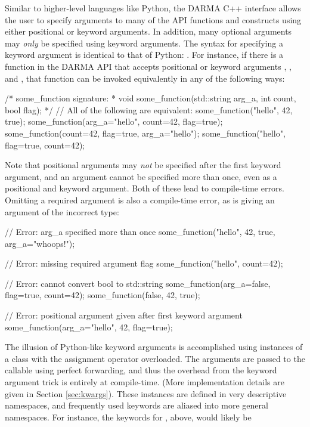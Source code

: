 Similar to higher-level languages like Python, the DARMA C++ interface allows the user
to specify arguments to many of the API functions and constructs using either positional
or keyword arguments.  In addition, many optional arguments may {\em only} be specified using
keyword arguments.  The syntax for specifying a keyword argument is identical to that
of Python: .  For instance, if there is a function  in the
DARMA API that accepts positional or keyword arguments , , and , that 
function can be invoked equivalently in any of the following ways:
\begin{CppCode}
/* some_function signature:
 *  void some_function(std::string arg_a, int count, bool flag);
 */
// All of the following are equivalent:
some_function("hello", 42, true);
some_function(arg_a="hello", count=42, flag=true);
some_function(count=42, flag=true, arg_a="hello");
some_function("hello", flag=true, count=42);
\end{CppCode}
Note that positional arguments may {\em not} be specified after the first keyword argument,
and an argument cannot be specified more than once, even as a positional and keyword
argument.  Both of these lead to compile-time errors. Omitting a required argument is 
also a compile-time error, as is giving an argument of the incorrect type: 
\begin{CppCode}
// Error: arg_a specified more than once
some_function("hello", 42, true, arg_a="whoops!");

// Error: missing required argument flag
some_function("hello", count=42);

// Error: cannot convert bool to std::string
some_function(arg_a=false, flag=true, count=42);
some_function(false, 42, true);

// Error: positional argument given after first keyword argument
some_function(arg_a="hello", 42, flag=true);
\end{CppCode}
The illusion of Python-like keyword arguments is accomplished using  instances
of a class with the assignment operator overloaded.  The arguments are passed to the 
callable using perfect forwarding, and thus the overhead from the keyword argument 
trick is entirely at compile-time.  (More implementation details are given in
Section \ref{sec:kwargs}).  These instances are defined in very descriptive namespaces,
and frequently used keywords are aliased into more general namespaces.  For instance, the keywords for , above, would likely be
